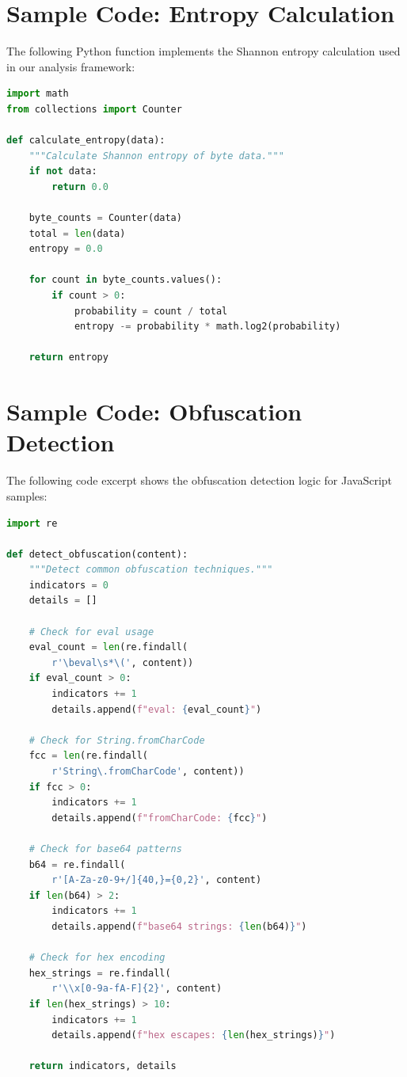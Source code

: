 \documentclass[pdflatex,sn-mathphys-num]{sn-jnl}
\theoremstyle{thmstyleone}%
\theoremstyle{thmstyletwo}%
\theoremstyle{thmstylethree}%
\begin{document}
\begin{appendices}

\section{Sample Code: Entropy Calculation}\label{secA1}

The following Python function implements the Shannon entropy calculation used in our analysis framework:

\begin{lstlisting}[language=Python, caption={Shannon entropy calculation function}]
import math
from collections import Counter

def calculate_entropy(data):
    """Calculate Shannon entropy of byte data."""
    if not data:
        return 0.0

    byte_counts = Counter(data)
    total = len(data)
    entropy = 0.0

    for count in byte_counts.values():
        if count > 0:
            probability = count / total
            entropy -= probability * math.log2(probability)

    return entropy
\end{lstlisting}

\section{Sample Code: Obfuscation Detection}\label{secA2}

The following code excerpt shows the obfuscation detection logic for JavaScript samples:

\begin{lstlisting}[language=Python, caption={JavaScript obfuscation detection}]
import re

def detect_obfuscation(content):
    """Detect common obfuscation techniques."""
    indicators = 0
    details = []

    # Check for eval usage
    eval_count = len(re.findall(
        r'\beval\s*\(', content))
    if eval_count > 0:
        indicators += 1
        details.append(f"eval: {eval_count}")

    # Check for String.fromCharCode
    fcc = len(re.findall(
        r'String\.fromCharCode', content))
    if fcc > 0:
        indicators += 1
        details.append(f"fromCharCode: {fcc}")

    # Check for base64 patterns
    b64 = re.findall(
        r'[A-Za-z0-9+/]{40,}={0,2}', content)
    if len(b64) > 2:
        indicators += 1
        details.append(f"base64 strings: {len(b64)}")

    # Check for hex encoding
    hex_strings = re.findall(
        r'\\x[0-9a-fA-F]{2}', content)
    if len(hex_strings) > 10:
        indicators += 1
        details.append(f"hex escapes: {len(hex_strings)}")

    return indicators, details
\end{lstlisting}

\end{appendices}


\end{document}
